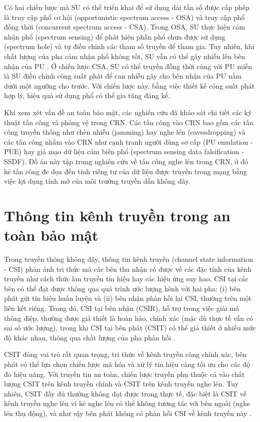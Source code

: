 \documentclass[../main.tex]{subfiles}
\begin{document}
Có hai chiến lược mà SU có thể triển khai để sử dụng dải tần số được cấp phép là truy cập phổ cơ hội (opportunistic spectrum access - OSA) và truy cập phổ đồng thời (concurrent spectrum access - CSA). Trong OSA, SU thực hiện cảm nhận phổ (spectrum sensing) để phát hiện phần phổ chưa được sử dụng (spectrum hole) và tự điều chỉnh các tham số truyền để tham gia. Tuy nhiên, khi chất lượng của pha cảm nhận phổ không tốt, SU vẫn có thể gây nhiễu lên bên nhận của PU \cite{sibomana2014impact}. Ở chiến lược CSA, SU có thể truyền đồng thời cùng với PU miễn là SU điều chỉnh công suất phát để can nhiễu gây cho bên nhận của PU nằm dưới một ngưỡng cho trước. Với chiến lược này, bằng việc thiết kế công suất phát hợp lý, hiệu quả sử dụng phổ có thể gia tăng đáng kể.

Khi xem xét vấn đề an toàn bảo mật, các nghiên cứu \cite{attar2012,salahdine2020security} đã khảo sát chi tiết các kỹ thuật tấn công và phòng vệ trong CRN. Các tấn công vào CRN bao gồm các tấn công truyền thống như chèn nhiễu (jamming) hay nghe lén (eavesdropping) và các tấn công nhằm vào CRN như cạnh tranh người dùng sơ cấp (PU emulation - PUE) hay giả mạo dữ liệu cảm biến phổ (spectrum sensing data falsification - SSDF). Đồ án này tập trung nghiên cứu về tấn công nghe lén trong CRN, ở đó kẻ tấn công đe dọa đến tính riêng tư của dữ liệu được truyền trong mạng bằng việc lợi dụng tính mở của môi trường truyền dẫn không dây.

\section{Thông tin kênh truyền trong an toàn bảo mật}

Trong truyền thông không dây, thông tin kênh truyền (channel state information - CSI) phản ánh tri thức mà các bên thu nhận có được về các đặc tính của kênh truyền như cách thức lan truyền tín hiệu hay các hiệu ứng suy hao. CSI tại các bên có thể đạt được thông qua quá trình ước lượng kênh với hai pha: (i) bên phát gửi tín hiệu huấn luyện và (ii) bên nhận phản hồi lại CSI, thường trên một liên kết riêng. Trong đó, CSI tại bên nhận (CSIR), hỗ trợ trong việc giải mã thông điệp, thường được giả thiết là hoàn hảo, chính xác (mặc dù thực tế vẫn có sai số ước lượng), trong khi CSI tại bên phát (CSIT) có thể giả thiết ở nhiều mức độ khác nhau, thông qua chất lượng của pha phản hồi \cite{hyadi2016overview}.

CSIT đóng vai trò rất quan trọng, tri thức về kênh truyền càng chính xác, bên phát có thể lựa chọn chiến lược mã hóa và xử lý tín hiệu càng tối ưu cho các độ đo hiệu năng. Với truyền tin an toàn, chiến lược truyền phụ thuộc cả vào chất lượng CSIT trên kênh truyền chính và CSIT trên kênh truyền nghe lén. Tuy nhiên, CSIT đầy đủ thường không đạt được trong thực tế, đặc biệt là CSIT về kênh truyền nghe lén vì kẻ nghe lén có thể không tương tác với bên ngoài (nghe lén thụ động), và như vậy bên phát không có phản hồi CSI về kênh truyền này \cite{he2013wireless}.
\end{document}
